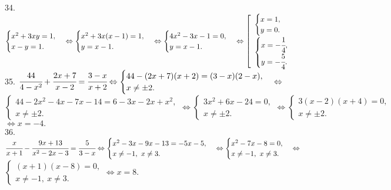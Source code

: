 34. $\begin{cases} x^2+3xy=1,\\ x-y=1.\end{cases}\Leftrightarrow\begin{cases} x^2+3x(x-1)=1,\\ y=x-1.\end{cases}
\Leftrightarrow\begin{cases} 4x^2-3x-1=0,\\ y=x-1.\end{cases}\Leftrightarrow\left[\begin{array}{l}\begin{cases} x=1,\\ y=0.\end{cases}\\ \begin{cases} x=-\cfrac{1}{4},\\ y=-\cfrac{5}{4}.\end{cases}\end{array}\right.$\\
35. $\cfrac{44}{4-x^2}+\cfrac{2x+7}{x-2}=\cfrac{3-x}{x+2}\Leftrightarrow \begin{cases}44-(2x+7)(x+2)=(3-x)(2-x),\\ x\neq\pm2.\end{cases}
\Leftrightarrow$\\$ \begin{cases}44-2x^2-4x-7x-14=6-3x-2x+x^2,\\ x\neq\pm2.\end{cases}
\Leftrightarrow \begin{cases}3x^2+6x-24=0,\\ x\neq\pm2.\end{cases}
\Leftrightarrow \begin{cases}3(x-2)(x+4)=0,\\ x\neq\pm2.\end{cases}$\\$\Leftrightarrow x=-4.$\\
36. $\cfrac{x}{x+1}-\cfrac{9x+13}{x^2-2x-3}=\cfrac{5}{3-x}\Leftrightarrow \begin{cases} x^2-3x-9x-13=-5x-5,\\ x\neq-1,\ x\neq3.\end{cases}
\Leftrightarrow \begin{cases} x^2-7x-8=0,\\ x\neq-1,\ x\neq3.\end{cases}
\Leftrightarrow$\\$\begin{cases} (x+1)(x-8)=0,\\ x\neq-1,\ x\neq3.\end{cases}\Leftrightarrow x=8.$\\

